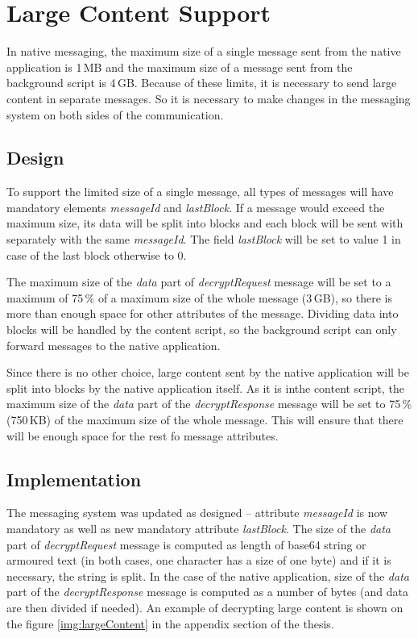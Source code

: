 \section{Large Content Support}
\label{sec:largeContent}
In native messaging, the maximum size of a single message sent from the native application is 1\,MB and the maximum size of a message sent from the background script is 4\,GB. Because of these limits, it is necessary to send large content in separate messages. So it is necessary to make changes in the messaging system on both sides of the communication.

\subsection{Design}
To support the limited size of a single message, all types of messages will have mandatory elements \textit{messageId} and \textit{lastBlock}. If a message would exceed the maximum size, its data will be split into blocks and each block will be sent with separately with the same \textit{messageId}. The field \textit{lastBlock} will be set to value 1 in case of the last block otherwise to 0.

The maximum size of the \textit{data} part of \textit{decryptRequest} message will be set to a maximum of 75\,\% of a maximum size of the whole message (3\,GB), so there is more than enough space for other attributes of the message. Dividing data into blocks will be handled by the content script, so the background script can only forward messages to the native application.

Since there is no other choice, large content sent by the native application will be split into blocks by the native application itself. As it is inthe  content script, the maximum size of the \textit{data} part of the \textit{decryptResponse} message will be set to 75\,\% (750\,KB) of the maximum size of the whole message. This will ensure that there will be enough space for the rest fo message attributes.

\subsection{Implementation}
The messaging system was updated as designed -- attribute \textit{messageId} is now mandatory as well as new mandatory attribute \textit{lastBlock}. The size of the \textit{data} part of \textit{decryptRequest} message is computed as length of base64 string or armoured text (in both cases, one character has a size of one byte) and if it is necessary, the string is split. In the case of the native application, size of the \textit{data} part of the \textit{decryptResponse} message is computed as a number of bytes (and data are then divided if needed). An example of decrypting large content is shown on the figure \ref{img:largeContent} in the appendix section of the thesis.

